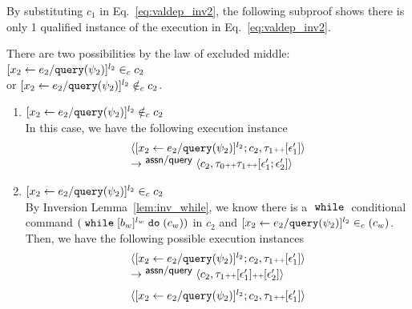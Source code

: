 \begin{subproof}
\[ \]
By substituting $c_1$ in Eq.~\ref{eq:valdep_inv2}, the following subproof shows there is only 1 qualified
 instance of the execution in Eq.~\ref{eq:valdep_inv2}.
\begin{subproof}[Subproof]
\label{pf:noiteration_inv2}
There are two possibilities by the law of excluded middle:
\\
$[\mathrel{ {x}_2 \leftarrow e_2 / {\tt query}(\psi_2) }]^{l_2} \in_c c_2$ 
\\
or $[\mathrel{ {x}_2 \leftarrow e_2 / {\tt query}(\psi_2) }]^{l_2} \notin_c c_2$.
%
\begin{enumerate}
\item{$[\mathrel{ {x}_2 \leftarrow e_2 / {\tt query}(\psi_2) }]^{l_2}\notin_c c_2$}
\\
In this case, we have the following execution instance
%
  \[
    \begin{array}{l}
  \langle [\mathrel{ {x}_2 \leftarrow e_2 / {\tt query}(\psi_2) }]^{l_2} ; {c}_2, \mathtt{\tau}_1 {\scriptscriptstyle ++} [\mathtt{\epsilon}_1'] \rangle
  \\ 
  \rightarrow^{\textsf{\small{ assn/query}}} 
  \langle {c}_2,  \mathtt{\tau}_0 {\scriptscriptstyle ++} \mathtt{\tau}_1 {\scriptscriptstyle ++} [\mathtt{\epsilon}_1'; \mathtt{\epsilon}_2'] \rangle 
    \end{array}
 \]
%
\item{$[\mathrel{ {x}_2 \leftarrow e_2 / {\tt query}(\psi_2) }]^{l_2} \in_c c_2$}
\\
By Inversion Lemma~\ref{lem:inv_while}, 
we know there is a $\;\mathtt{while}\;$ conditional command
 $(\;\mathtt{while}\; [b_w]^{l_w} \;\mathtt{do}\; (c_w))$ in $c_2$ and
$[\mathrel{ {x}_2 \leftarrow e_2 / {\tt query}(\psi_2) }]^{l_2} \in_c (c_w)$.
Then, we have the following possible execution instances
  \[
    \begin{array}{l}
      \langle [\mathrel{ {x}_2 \leftarrow e_2 / {\tt query}(\psi_2) }]^{l_2} ; {c}_2, \mathtt{\tau}_1 {\scriptscriptstyle ++} [\mathtt{\epsilon}_1'] \rangle 
      \\ 
      \rightarrow^{\textsf{\small{ assn/query}}} 
      \langle {c}_2,  \mathtt{\tau}_1 {\scriptscriptstyle ++} [\mathtt{\epsilon}_1']{\scriptscriptstyle ++} [\mathtt{\epsilon}_2'] \rangle 
\end{array}
\]
%
  \[
  \begin{array}{l}
  \langle [\mathrel{ {x}_2 \leftarrow e_2 / {\tt query}(\psi_2) }]^{l_2} ; {c}_2, \mathtt{\tau}_1 {\scriptscriptstyle ++} [\mathtt{\epsilon}_1'] \rangle 

\end{array}\]
\end{enumerate}
\end{subproof}
\end{subproof}
